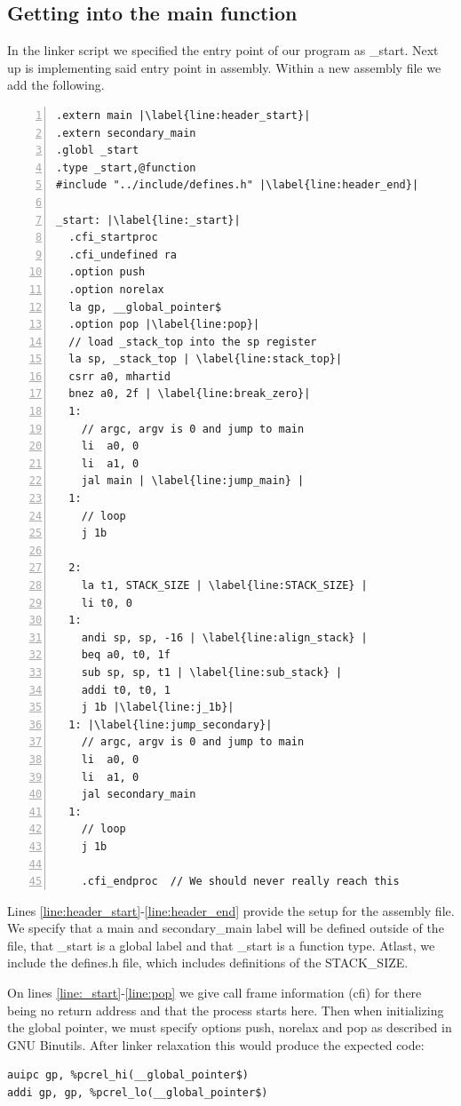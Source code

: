 \subsection{Getting into the main function}\label{sec:get_main}
In the linker script we specified the entry point of our program as \_start.
Next up is implementing said entry point in assembly. Within a new assembly file
we add the following.
\begin{lstlisting}[numbers=left, escapechar=|]
.extern main |\label{line:header_start}|
.extern secondary_main
.globl _start
.type _start,@function
#include "../include/defines.h" |\label{line:header_end}|

_start: |\label{line:_start}|
  .cfi_startproc
  .cfi_undefined ra
  .option push
  .option norelax
  la gp, __global_pointer$
  .option pop |\label{line:pop}|
  // load _stack_top into the sp register
  la sp, _stack_top | \label{line:stack_top}|
  csrr a0, mhartid
  bnez a0, 2f | \label{line:break_zero}|
  1:
    // argc, argv is 0 and jump to main
    li  a0, 0
    li  a1, 0
    jal main | \label{line:jump_main} |
  1:
    // loop
    j 1b

  2:
    la t1, STACK_SIZE | \label{line:STACK_SIZE} |
    li t0, 0
  1:
    andi sp, sp, -16 | \label{line:align_stack} |
    beq a0, t0, 1f
    sub sp, sp, t1 | \label{line:sub_stack} |
    addi t0, t0, 1
    j 1b |\label{line:j_1b}|
  1: |\label{line:jump_secondary}|
    // argc, argv is 0 and jump to main
    li  a0, 0
    li  a1, 0
    jal secondary_main
  1:
    // loop
    j 1b

    .cfi_endproc  // We should never really reach this
\end{lstlisting}
Lines \ref{line:header_start}-\ref{line:header_end} provide the setup for the
assembly file. We specify that a main and secondary\_main label will be defined outside of the file,
that \_start is a global label and that \_start is a function type. Atlast, we
include the defines.h file, which includes definitions of the STACK\_SIZE.

On lines \ref{line:_start}-\ref{line:pop} we give call frame information (cfi)
for there being no return address and that the process starts here. Then when
initializing the global pointer, we must specify options push, norelax and pop
as described in GNU Binutils. \cite{GNU_bin} After linker relaxation this would
produce the expected code:
\begin{lstlisting}
auipc gp, %pcrel_hi(__global_pointer$)
addi gp, gp, %pcrel_lo(__global_pointer$)
\end{lstlisting}

